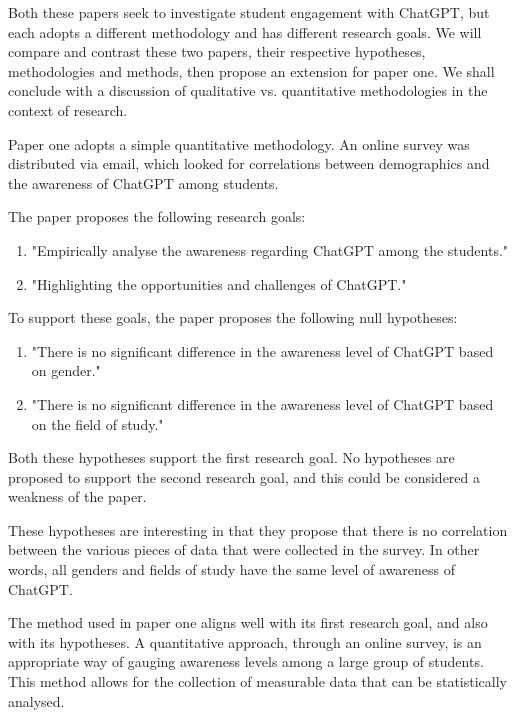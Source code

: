 \documentclass[12pt]{article}
\begin{document}
Both these papers seek to investigate student engagement with ChatGPT, but each adopts a different methodology and has different research goals. We will compare and contrast these two papers, their respective hypotheses, methodologies and methods, then propose an extension for paper one. We shall conclude with a discussion of qualitative vs. quantitative methodologies in the context of research. 

Paper one adopts a simple quantitative methodology. An online survey was distributed via email, which looked for correlations between demographics and the awareness of ChatGPT among students.

The paper proposes the following research goals:

\begin{enumerate}
    \item "Empirically analyse the awareness regarding ChatGPT among the students."
    \item "Highlighting the opportunities and challenges of ChatGPT." \cite{paper1}
\end{enumerate}

To support these goals, the paper proposes the following null hypotheses:

\begin{enumerate}
    \item "There is no significant difference in the awareness level of ChatGPT based on gender."
    \item "There is no significant difference in the awareness level of ChatGPT based on the field of study." \cite{paper1}
\end{enumerate}

Both these hypotheses support the first research goal. No hypotheses are proposed to support the second research goal, and this could be considered a weakness of the paper.

These hypotheses are interesting in that they propose that there is no correlation between the various pieces of data that were collected in the survey. In other words, all genders and fields of study have the same level of awareness of ChatGPT.

The method used in paper one aligns well with its first research goal, and also with its hypotheses. A quantitative approach, through an online survey, is an appropriate way of gauging awareness levels among a large group of students. This method allows for the collection of measurable data that can be statistically analysed. \cite{cresswell}
\end{document}

